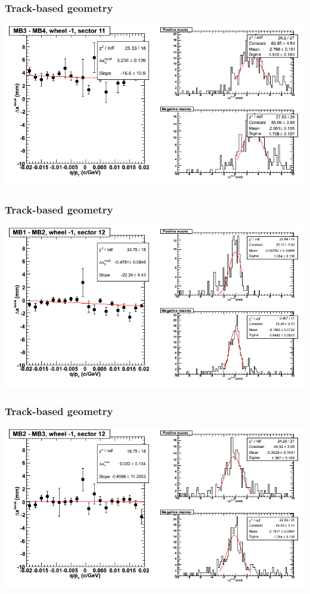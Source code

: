 \documentclass[compress]{beamer}
\begin{document}
\begin{frame}
\frametitle{Track-based geometry}
\includegraphics[width=\linewidth]{NOV4_segdiffs/dt13_resid_B_11_34.png}
\end{frame}

\begin{frame}
\frametitle{Track-based geometry}
\includegraphics[width=\linewidth]{NOV4_segdiffs/dt13_resid_B_12_12.png}
\end{frame}

\begin{frame}
\frametitle{Track-based geometry}
\includegraphics[width=\linewidth]{NOV4_segdiffs/dt13_resid_B_12_23.png}
\end{frame}
\end{document}

